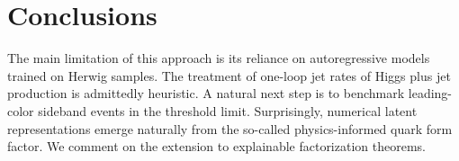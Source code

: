 \section{Conclusions}\label{sec:conclusions}

The main limitation of this approach is its reliance on autoregressive
models trained on Herwig samples. The treatment of one-loop jet rates of
Higgs plus jet production is admittedly heuristic. A natural next step
is to benchmark leading-color sideband events in the threshold limit.
Surprisingly, numerical latent representations emerge naturally from the
so-called physics-informed quark form factor. We comment on the
extension to explainable factorization theorems.

